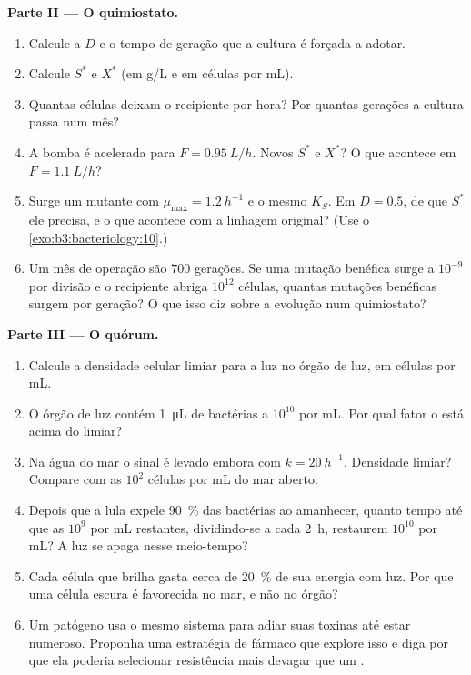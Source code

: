 \begin{problem}
\medskip
\noindent\textbf{Parte II --- O quimiostato.}
\begin{enumerate}[resume]
  \item Calcule a  $D$ e o tempo de geração que a
        cultura é forçada a adotar.
  \item Calcule $S^{*}$ e $X^{*}$ (em g/L e em células por mL).
  \item Quantas células deixam o recipiente por hora? Por quantas
        gerações a cultura passa num mês?
  \item A bomba é acelerada para $F = \qty{0.95}{L/h}$. Novos $S^{*}$ e
        $X^{*}$? O que acontece em $F = \qty{1.1}{L/h}$?
  \item Surge um mutante com $\mu_{\max} = \qty{1.2}{h^{-1}}$ e o mesmo
        $K_{S}$. Em $D = 0.5$, de que $S^{*}$ ele precisa, e o que
        acontece com a linhagem original? (Use o
        \cref{exo:b3:bacteriology:10}.)
  \item Um mês de operação são $700$ gerações. Se uma mutação benéfica
        surge a $10^{-9}$ por divisão e o recipiente abriga $10^{12}$
        células, quantas mutações benéficas surgem por geração? O que
        isso diz sobre a evolução num quimiostato?
\end{enumerate}

\medskip
\noindent\textbf{Parte III --- O quórum.}
\begin{enumerate}[resume]
  \item Calcule a densidade celular limiar para a luz no órgão de luz,
        em células por mL.
  \item O órgão de luz contém \qty{1}{\micro L} de bactérias a
        $10^{10}$ por mL. Por qual fator o  está acima do
        limiar?
  \item Na água do mar o sinal é levado embora com
        $k = \qty{20}{h^{-1}}$. Densidade limiar? Compare com as
        $10^{2}$ células por mL do mar aberto.
  \item Depois que a lula expele \qty{90}{\%} das bactérias ao
        amanhecer, quanto tempo até que as $10^{9}$ por mL restantes,
        dividindo-se a cada \qty{2}{h}, restaurem $10^{10}$ por mL? A
        luz se apaga nesse meio-tempo?
  \item Cada célula que brilha gasta cerca de \qty{20}{\%} de sua
        energia com luz. Por que uma célula escura é favorecida no mar,
        e não no órgão?
  \item Um patógeno usa o mesmo sistema para adiar suas toxinas até
        estar numeroso. Proponha uma estratégia de fármaco que explore
        isso e diga por que ela poderia selecionar resistência mais
        devagar que um .
\end{enumerate}


\end{problem}
